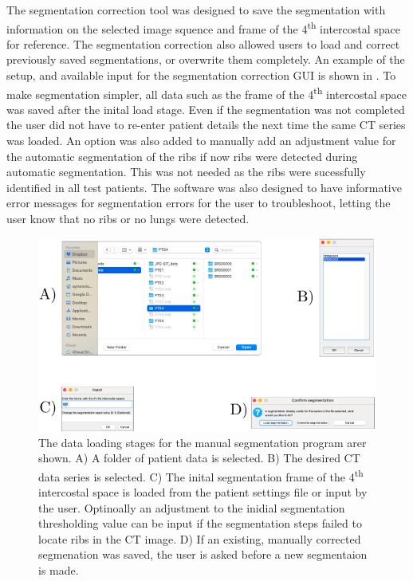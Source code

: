The segmentation correction tool was designed to save the segmentation with information
on the selected image squence and frame of the 4\textsuperscript{th} intercostal space 
for reference. 
The segmentation correction also allowed users to load and correct previously saved
segmentations, or overwrite them completely.
An example of the setup, and available input for the segmentation 
correction GUI is shown in .
To make segmentation simpler, all data such as the frame of the 4\textsuperscript{th}
intercostal space was saved after the inital load stage. Even if the segmentation 
was not completed the user did not have to re-enter patient details the next 
time the same CT series was loaded. 
An option was also added to manually add an adjustment value for the automatic
segmentation of the ribs if now ribs were detected during automatic segmentation. 
This was not needed as the ribs were sucessfully identified in all test patients.
The software was also designed to have informative error messages for segmentation 
errors for the user to troubleshoot, letting the user know that no ribs or no lungs 
were detected. 

\begin{figure}
	\centering
	\includegraphics[width=\textwidth]{chapter5-CT_to_mesh/imgs/SegmentationAppSetup.pdf}
	\caption[Manual segmentation data loading]{\label{fig:seg_load}%
	The data loading stages for the manual segmentation program arer shown.
	A) A folder of patient data is selected. B) The desired CT data series is selected.
	C) The inital segmentation frame of the 4\textsuperscript{th} intercostal space 
	is loaded from the patient settings file or input by the user. Optinoally an 
	adjustment to the inidial segmentation thresholding value can be input if the 
	segmentation steps failed to locate ribs in the CT image. D) If an existing,
	manually corrected segmenation was saved, the user is asked before a new segmentaion 
	is made.
	}
\end{figure}

